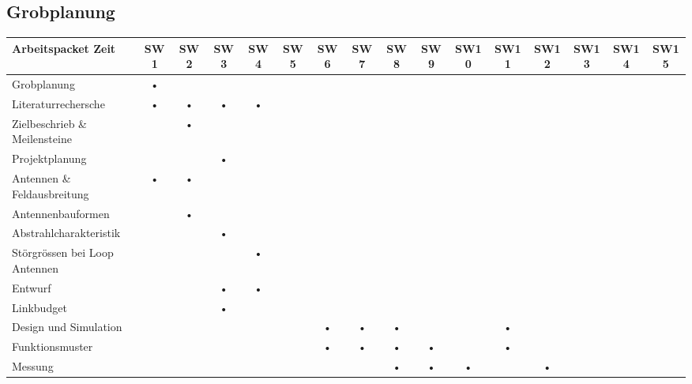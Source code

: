 \begin{landscape}
\section{Grobplanung}

\begin{longtable}{l|c|c|c|c|c|c|c|c|c|c|c|c|c|c|c}%
\hline 
Arbeitspacket Zeit & SW1 & SW2 & SW3 & SW4 & SW5 & SW6 & SW7 & SW8 & SW9 & SW10 & SW11 & SW12 & SW13 & SW14 & SW15   \\ %
\hline 
\hline 


Grobplanung & \cellcolor{gray!50}• &  &  &  &  &  &  &  &  &  &  &  &  &  & \\  
\hline 
Literaturrechersche & \cellcolor{gray!50}• & \cellcolor{gray!50}•  & \cellcolor{gray!50}• & \cellcolor{gray!50}•  &  &  &  &  &  &  &  &  &  & &\\ 
\hline 
Zielbeschrieb \& Meilensteine &  & \cellcolor{gray!50}• &  &  &  &  &  &  &  &  &  &  & & &\\
\hline
Projektplanung  &  &  & \cellcolor{gray!50}•  &  &  &  &  &  &  &  &  &  & & &\\ 
\hline 
Antennen \& Feldausbreitung & \cellcolor{gray!50}• & \cellcolor{gray!50}• &  &  &  &  &  &  &  &  &  &  &  & &\\ 
\hline 
Antennenbauformen &  & \cellcolor{gray!50}• &  &  &  &  &  &  &  &  &  &  &  &    &\\ 
\hline 
Abstrahlcharakteristik &  &  & \cellcolor{gray!50}• &  &  &  &  &  &  &  &  &  &  & &\\ 
\hline 
Störgrössen bei Loop Antennen &  &  &  & \cellcolor{gray!50}• & &  &  &  &  & &  &  &  & &\\ 
\hline 
Entwurf &  &  & \cellcolor{gray!50}• & \cellcolor{gray!50}• &  &  &  &  & &  &  &  &  & \\ 
\hline 
Linkbudget &  &  & \cellcolor{gray!50}• &  &  &  &  &  &  &  &  &  &  &\\ 
\hline 
Design und Simulation &  &  &  &  &  & \cellcolor{gray!50}• & \cellcolor{gray!50}• & \cellcolor{gray!50}• &  &  & \cellcolor{gray!50}• &  & & \\ 
\hline 
Funktionsmuster &  &  &  &  &  & \cellcolor{gray!50}• & \cellcolor{gray!50}• & \cellcolor{gray!50}• & \cellcolor{gray!50}• &  & \cellcolor{gray!50}• &  & & \\ 
\hline 
Messung  &  &  &  &  &  &  &  & \cellcolor{gray!50}• & \cellcolor{gray!50}• & \cellcolor{gray!50}• &  & \cellcolor{gray!50}• &  &  &  \\ 

\end{longtable}
\end{landscape}
